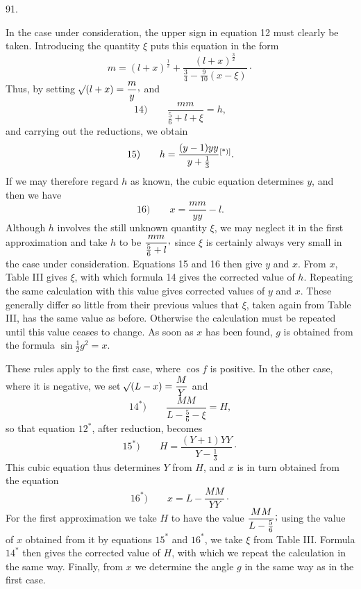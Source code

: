 \par{}\medskip
\hypertarget{native-124-article091}{}
\begin{center}91.\end{center}
In the case under consideration, the upper sign in equation 12 must clearly be taken. Introducing the quantity $\xi$ puts this equation in the form
\[
m=(l+x)^{\frac12}+\dfrac{(l+x)^{\frac32}}{\frac34-\frac{9}{10}(x-\xi)}\mathpunct{\cdot}
\]
Thus, by setting $\BareRoot{(l+x)}=\dfrac{m}{y}\mathpunct{\raisebox{.45ex}{,}}$ and
\[
\mathrm{14)}\qquad \dfrac{mm}{\frac56+l+\xi}=h,
\]
and carrying out the reductions, we obtain
\[
\mathrm{15)}\qquad h=\dfrac{(y-1)yy}{y+\frac13}\mbox{\HistoricalDisplayNoteMark}.
\]
\noindent\HistoricalDisplayNoteText{Manuscript note:]
\[
y-1=\dfrac{l+x}{\frac34-\frac{9}{10}(x-\xi)}
\]
\[
y=1+\frac{10}{9}h-\frac{110}{81}hh+\frac{2410}{729}h^3-\text{etc.}
\]
\[
yy=1+\frac{20}{9}h-\frac{40}{27}hh+\frac{2620}{729}h^3-\text{etc.}
\]
\[
\dfrac{1}{yy}=1-\frac{20}{9}h+\frac{520}{81}hh-\frac{5140}{243}h^3+\text{etc.}
\]
}If we may therefore regard $h$ as known, the cubic equation determines $y$, and then we have
\[
\mathrm{16)}\qquad x=\dfrac{mm}{yy}-l.
\]
Although $h$ involves the still unknown quantity $\xi$, we may neglect it in the first approximation and take $h$ to be $\dfrac{mm}{\frac56+l}\mathpunct{\raisebox{.45ex}{,}}$ since $\xi$ is certainly always very small in the case under consideration. Equations 15 and 16 then give $y$ and $x$. From $x$, Table III gives $\xi$, with which formula 14 gives the corrected value of $h$. Repeating the same calculation with this value gives corrected values of $y$ and $x$. These generally differ so little from their previous values that $\xi$, taken again from Table III, has the same value as before. Otherwise the calculation must be repeated until this value ceases to change. As soon as $x$ has been found, $g$ is obtained from the formula $\sin\tfrac12 g^2=x$.

These rules apply to the first case, where $\cos f$ is positive. In the other case, where it is negative, we set $\mathord{{}^{}\!\surd}(L-x)=\dfrac{M}{Y}$ and
\[
\mathrm{14}^{\ast}\mathrm{)}\qquad \dfrac{MM}{L-\frac56-\xi}=H,
\]
so that equation $12^{\ast}$, after reduction, becomes
\[
\mathrm{15}^{\ast}\mathrm{)}\qquad H=\dfrac{(Y+1)YY}{Y-\frac13}\mathpunct{\cdot}
\]
This cubic equation thus determines $Y$ from $H$, and $x$ is in turn obtained from the equation
\[
\mathrm{16}^{\ast}\mathrm{)}\qquad x=L-\dfrac{MM}{YY}\mathpunct{\cdot}
\]
For the first approximation we take $H$ to have the value $\dfrac{MM}{L-\frac56}\mathpunct{\raisebox{.45ex}{;}}$ using the value of $x$ obtained from it by equations $15^{\ast}$ and $16^{\ast}$, we take $\xi$ from Table III. Formula $14^{\ast}$ then gives the corrected value of $H$, with which we repeat the calculation in the same way. Finally, from $x$ we determine the angle $g$ in the same way as in the first case.
